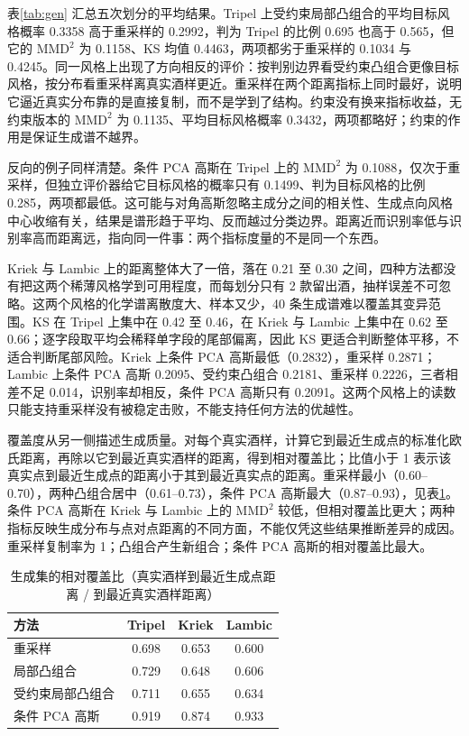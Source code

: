 表\ref{tab:gen} 汇总五次划分的平均结果。Tripel 上受约束局部凸组合的平均目标风格概率 0.3358 高于重采样的 0.2992，判为 Tripel 的比例 0.695 也高于 0.565，但它的 $\mathrm{MMD}^2$ 为 0.1158、KS 均值 0.4463，两项都劣于重采样的 0.1034 与 0.4245。同一风格上出现了方向相反的评价：按判别边界看受约束凸组合更像目标风格，按分布看重采样离真实酒样更近。重采样在两个距离指标上同时最好，说明它逼近真实分布靠的是直接复制，而不是学到了结构。约束没有换来指标收益，无约束版本的 $\mathrm{MMD}^2$ 为 0.1135、平均目标风格概率 0.3432，两项都略好；约束的作用是保证生成谱不越界。

反向的例子同样清楚。条件 PCA 高斯在 Tripel 上的 $\mathrm{MMD}^2$ 为 0.1088，仅次于重采样，但独立评价器给它目标风格的概率只有 0.1499、判为目标风格的比例 0.285，两项都最低。这可能与对角高斯忽略主成分之间的相关性、生成点向风格中心收缩有关，结果是谱形趋于平均、反而越过分类边界。距离近而识别率低与识别率高而距离远，指向同一件事：两个指标度量的不是同一个东西。

Kriek 与 Lambic 上的距离整体大了一倍，落在 0.21 至 0.30 之间，四种方法都没有把这两个稀薄风格学到可用程度，而每划分只有 2 款留出酒，抽样误差不可忽略。这两个风格的化学谱离散度大、样本又少，40 条生成谱难以覆盖其变异范围。KS 在 Tripel 上集中在 0.42 至 0.46，在 Kriek 与 Lambic 上集中在 0.62 至 0.66；逐字段取平均会稀释单字段的尾部偏离，因此 KS 更适合判断整体平移，不适合判断尾部风险。Kriek 上条件 PCA 高斯最低（0.2832），重采样 0.2871；Lambic 上条件 PCA 高斯 0.2095、受约束凸组合 0.2181、重采样 0.2226，三者相差不足 0.014，识别率却相反，条件 PCA 高斯只有 0.2091。这两个风格上的读数只能支持重采样没有被稳定击败，不能支持任何方法的优越性。

覆盖度从另一侧描述生成质量。对每个真实酒样，计算它到最近生成点的标准化欧氏距离，再除以它到最近真实酒样的距离，得到相对覆盖比；比值小于 1 表示该真实点到最近生成点的距离小于其到最近真实点的距离。重采样最小（0.60--0.70），两种凸组合居中（0.61--0.73），条件 PCA 高斯最大（0.87--0.93），见表\ref{tab:coverage}。条件 PCA 高斯在 Kriek 与 Lambic 上的 $\mathrm{MMD}^2$ 较低，但相对覆盖比更大；两种指标反映生成分布与点对点距离的不同方面，不能仅凭这些结果推断差异的成因。重采样复制率为 1；凸组合产生新组合；条件 PCA 高斯的相对覆盖比最大。

\begin{table}[t]
\centering\small\renewcommand{\arraystretch}{1.15}
\caption{生成集的相对覆盖比（真实酒样到最近生成点距离 / 到最近真实酒样距离）}
\label{tab:coverage}
\begin{tabular}{@{}lccc@{}}
\toprule
方法 & Tripel & Kriek & Lambic \\
\midrule
重采样 & 0.698 & 0.653 & 0.600 \\
局部凸组合 & 0.729 & 0.648 & 0.606 \\
受约束局部凸组合 & 0.711 & 0.655 & 0.634 \\
条件 PCA 高斯 & 0.919 & 0.874 & 0.933 \\
\bottomrule
\end{tabular}
\end{table}

